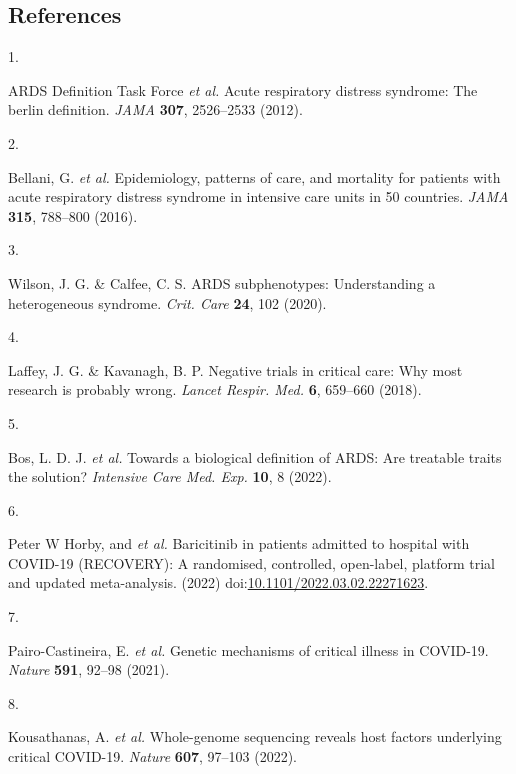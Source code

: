 \documentclass[
  11,
  a4paper,
]{article}
\newlength{\cslhangindent}
\newlength{\csllabelwidth}
\newlength{\cslentryspacingunit} %
\newenvironment{CSLReferences}[2] %
 {%
  \setlength{\parindent}{0pt}
  \ifodd #1
  \let\oldpar\par
  \def\par{\hangindent=\cslhangindent\oldpar}
  \fi
  \setlength{\parskip}{#2\cslentryspacingunit}
 }%
 {}
\newcommand{\CSLLeftMargin}[1]{\parbox[t]{\csllabelwidth}{#1}}
\newcommand{\CSLRightInline}[1]{\parbox[t]{\linewidth - \csllabelwidth}{#1}\break}
\begin{document}
\hypertarget{references}{%
\subsection{References}\label{references}}

\hypertarget{refs}{}
\begin{CSLReferences}{0}{0}
\leavevmode{}%
\CSLLeftMargin{1. }%
\CSLRightInline{ARDS Definition Task Force \emph{et al.} Acute
respiratory distress syndrome: The berlin definition. \emph{JAMA}
\textbf{307}, 2526--2533 (2012).}

\leavevmode{}%
\CSLLeftMargin{2. }%
\CSLRightInline{Bellani, G. \emph{et al.} Epidemiology, patterns of
care, and mortality for patients with acute respiratory distress
syndrome in intensive care units in 50 countries. \emph{JAMA}
\textbf{315}, 788--800 (2016).}

\leavevmode{}%
\CSLLeftMargin{3. }%
\CSLRightInline{Wilson, J. G. \& Calfee, C. S. {ARDS} subphenotypes:
Understanding a heterogeneous syndrome. \emph{Crit. Care} \textbf{24},
102 (2020).}

\leavevmode{}%
\CSLLeftMargin{4. }%
\CSLRightInline{Laffey, J. G. \& Kavanagh, B. P. Negative trials in
critical care: Why most research is probably wrong. \emph{Lancet Respir.
Med.} \textbf{6}, 659--660 (2018).}

\leavevmode{}%
\CSLLeftMargin{5. }%
\CSLRightInline{Bos, L. D. J. \emph{et al.} Towards a biological
definition of {ARDS}: Are treatable traits the solution? \emph{Intensive
Care Med. Exp.} \textbf{10}, 8 (2022).}

\leavevmode{}%
\CSLLeftMargin{6. }%
\CSLRightInline{Peter W Horby, and \emph{et al.} Baricitinib in patients
admitted to hospital with {COVID}-19 ({RECOVERY}): A randomised,
controlled, open-label, platform trial and updated meta-analysis. (2022)
doi:\href{https://doi.org/10.1101/2022.03.02.22271623}{10.1101/2022.03.02.22271623}.}

\leavevmode{}%
\CSLLeftMargin{7. }%
\CSLRightInline{Pairo-Castineira, E. \emph{et al.} Genetic mechanisms of
critical illness in {COVID-19}. \emph{Nature} \textbf{591}, 92--98
(2021).}

\leavevmode{}%
\CSLLeftMargin{8. }%
\CSLRightInline{Kousathanas, A. \emph{et al.} Whole-genome sequencing
reveals host factors underlying critical {COVID-19}. \emph{Nature}
\textbf{607}, 97--103 (2022).}


\end{CSLReferences}
\end{document}

